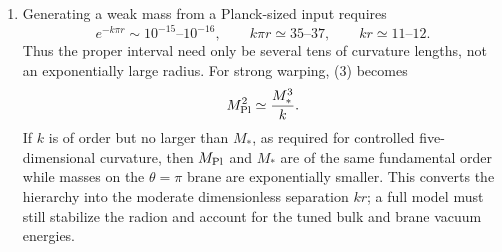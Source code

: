\begin{enumerate}
\begin{enumerate}
    \item Generating a weak mass from a Planck-sized input requires
      \[
        e^{-k\pi r}\sim10^{-15}\text{--}10^{-16},
        \qquad
        k\pi r\simeq35\text{--}37,
        \qquad
        \boxed{kr\simeq11\text{--}12.}
      \]
      Thus the proper interval need only be several tens of curvature
      lengths, not an exponentially large radius.  For strong warping,
      (3) becomes
      \[
        M_{\rm Pl}^2\simeq\frac{M_*^3}{k}.
      \]
      If \(k\) is of order but no larger than \(M_*\), as required for
      controlled five-dimensional curvature, then \(M_{\rm Pl}\) and
      \(M_*\) are of the same fundamental order while masses on the
      \(\theta=\pi\) brane are exponentially smaller.  This converts the
      hierarchy into the moderate dimensionless separation \(kr\); a full
      model must still stabilize the radion and account for the tuned bulk
      and brane vacuum energies.
  \end{enumerate}

\end{enumerate}
